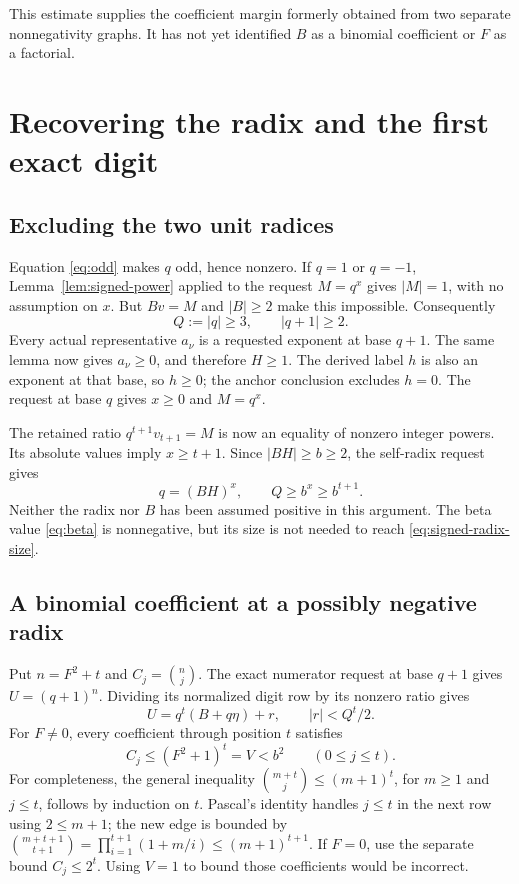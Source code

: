 \documentclass[11pt]{article}
\theoremstyle{definition}\newtheorem{definition}[theorem]{Definition}
\begin{document}
This estimate supplies the coefficient margin formerly obtained from
two separate nonnegativity graphs. It has not yet identified \(B\)
as a binomial coefficient or \(F\) as a factorial.

\section{Recovering the radix and the first exact digit}

\subsection{Excluding the two unit radices}

Equation \eqref{eq:odd} makes \(q\) odd, hence nonzero. If \(q=1\)
or \(q=-1\), Lemma~\ref{lem:signed-power} applied to the request
\(M=q^x\) gives \(|M|=1\), with no assumption on \(x\).
But \(Bv=M\) and \(|B|\ge2\) make this impossible. Consequently
\[
 Q:=|q|\ge3,\qquad |q+1|\ge2.
\]
Every actual representative \(a_\nu\) is a requested exponent at
base \(q+1\). The same lemma now gives \(a_\nu\ge0\), and therefore
\(H\ge1\). The derived label \(h\) is also an exponent at that base,
so \(h\ge0\); the anchor conclusion excludes \(h=0\).
The request at base \(q\) gives \(x\ge0\) and \(M=q^x\).

The retained ratio \(q^{t+1}v_{t+1}=M\) is now an equality of
nonzero integer powers. Its absolute values imply \(x\ge t+1\).
Since \(|BH|\ge b\ge2\), the self-radix request gives
\begin{equation}\label{eq:signed-radix-size}
 q=(BH)^x,\qquad Q\ge b^x\ge b^{t+1}.
\end{equation}
Neither the radix nor \(B\) has been assumed positive in this argument.
The beta value \eqref{eq:beta} is nonnegative, but its size is not
needed to reach \eqref{eq:signed-radix-size}.

\subsection{A binomial coefficient at a possibly negative radix}

Put \(n=F^2+t\) and \(C_j=\binom{n}{j}\). The exact numerator request
at base \(q+1\) gives \(U=(q+1)^n\). Dividing its normalized digit
row by its nonzero ratio gives
\begin{equation}\label{eq:factor-digit}
 U=q^t(B+q\eta)+r,\qquad |r|<Q^t/2.
\end{equation}
For \(F\ne0\), every coefficient through position \(t\) satisfies
\begin{equation}\label{eq:coeff}
 C_j\le(F^2+1)^t=V<b^2\qquad(0\le j\le t).
\end{equation}
For completeness, the general inequality
\(\binom{m+t}{j}\le(m+1)^t\), for \(m\ge1\) and \(j\le t\),
follows by induction on \(t\). Pascal's identity handles
\(j\le t\) in the next row using \(2\le m+1\); the new edge is
bounded by
\(\binom{m+t+1}{t+1}=\prod_{i=1}^{t+1}(1+m/i)\le(m+1)^{t+1}\).
If \(F=0\), use the separate bound \(C_j\le2^t\).
Using \(V=1\) to bound those coefficients would be incorrect.
\end{document}
